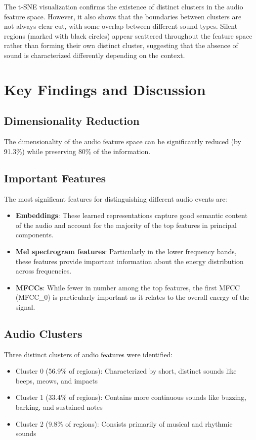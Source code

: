 \documentclass[11pt,a4paper]{article}
\begin{document}
The t-SNE visualization confirms the existence of distinct clusters in the audio feature space. However, it also shows that the boundaries between clusters are not always clear-cut, with some overlap between different sound types. Silent regions (marked with black circles) appear scattered throughout the feature space rather than forming their own distinct cluster, suggesting that the absence of sound is characterized differently depending on the context.

\section{Key Findings and Discussion}

\subsection{Dimensionality Reduction}
The dimensionality of the audio feature space can be significantly reduced (by 91.3\%) while preserving 80\% of the information.

\subsection{Important Features}

The most significant features for distinguishing different audio events are:
\begin{itemize}
    \item \textbf{Embeddings}: These learned representations capture good semantic content of the audio and account for the majority of the top features in principal components.
    \item \textbf{Mel spectrogram features}: Particularly in the lower frequency bands, these features provide important information about the energy distribution across frequencies.
    \item \textbf{MFCCs}: While fewer in number among the top features, the first MFCC (MFCC\_0) is particularly important as it relates to the overall energy of the signal.
\end{itemize}

\subsection{Audio Clusters}

Three distinct clusters of audio features were identified:
\begin{itemize}
    \item Cluster 0 (56.9\% of regions): Characterized by short, distinct sounds like beeps, meows, and impacts
    \item Cluster 1 (33.4\% of regions): Contains more continuous sounds like buzzing, barking, and sustained notes
    \item Cluster 2 (9.8\% of regions): Consists primarily of musical and rhythmic sounds
\end{itemize}
\end{document}
